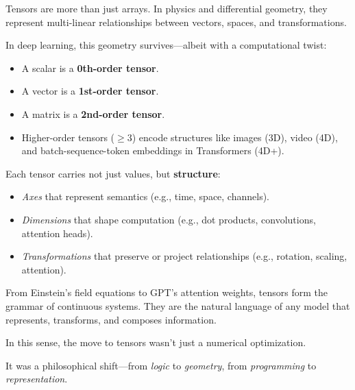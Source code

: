 \begin{tcolorbox}[colback=purple!5!white, colframe=purple!75!black, title={Sidebar: Tensors as Geometric Objects}]
    Tensors are more than just arrays. In physics and differential geometry, they represent multi-linear relationships between vectors, spaces, and transformations.
    
    In deep learning, this geometry survives—albeit with a computational twist:
    
    \begin{itemize}
      \item A scalar is a \textbf{0th-order tensor}.
      \item A vector is a \textbf{1st-order tensor}.
      \item A matrix is a \textbf{2nd-order tensor}.
      \item Higher-order tensors (\( \geq 3 \)) encode structures like images (3D), video (4D), and batch-sequence-token embeddings in Transformers (4D+).
    \end{itemize}
    
    Each tensor carries not just values, but \textbf{structure}:
    \begin{itemize}
      \item \emph{Axes} that represent semantics (e.g., time, space, channels).
      \item \emph{Dimensions} that shape computation (e.g., dot products, convolutions, attention heads).
      \item \emph{Transformations} that preserve or project relationships (e.g., rotation, scaling, attention).
    \end{itemize}
    
    From Einstein’s field equations to GPT’s attention weights, tensors form the grammar of continuous systems. They are the natural language of any model that represents, transforms, and composes information.
    
    In this sense, the move to tensors wasn’t just a numerical optimization.
    
    It was a philosophical shift—from \emph{logic} to \emph{geometry}, from \emph{programming} to \emph{representation}.
\end{tcolorbox}
